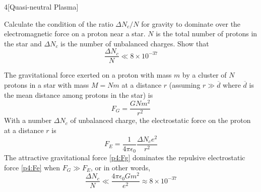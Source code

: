 \documentclass[12pt]{article}
\begin{document}
\begin{problem}{4}[Quasi-neutral Plasma]

Calculate the condition of the ratio $\Delta N_c/N$ for gravity to dominate over
the electromagnetic force on a proton near a star. $N$ is the total number of
protons in the star and $\Delta N_c$ is the number of unbalanced charges. Show
that
\begin{equation}
    \frac{\Delta N_c}{N}\ll8\times10^{-37} 
\end{equation}

\begin{solution}
    The gravitational force exerted on a proton with mass $m$ by a cluster of
    $N$ protons in a star with mass $M=Nm$ at a distance $r$ (assuming
    $r\gg\overline{d}$ where $\overline{d}$ is the mean distance among protons
    in the star) is
    \begin{equation}\label{p4:Fg}
        F_G=\frac{GNm^2}{r^2} 
    \end{equation}
    With a number $\Delta N_c$ of unbalanced charge, the electrostatic force on
    the proton at a distance $r$ is
    \begin{equation}\label{p4:Fe}
        F_E=\frac{1}{4\pi\epsilon_0}\frac{\Delta N_ce^2}{r^2} 
    \end{equation}
    The attractive gravitational force \eqref{p4:Fg} dominates the repulsive
    electrostatic force \eqref{p4:Fe} when $F_G\gg F_E$, or in other words,
    \begin{equation}
        \frac{\Delta
        N_c}{N}\ll\frac{4\pi\epsilon_0Gm^2}{e^2}\approx8\times10^{-37} 
    \end{equation}
\end{solution}
    
\end{problem}
\end{document}

